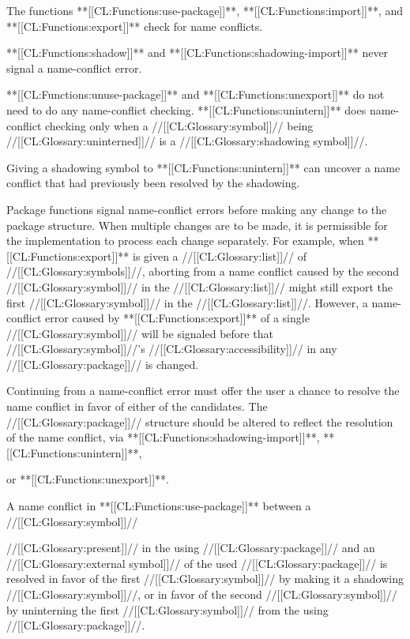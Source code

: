 \itemitem{--}  The functions **[[CL:Functions:use-package]]**, **[[CL:Functions:import]]**, and  **[[CL:Functions:export]]** check for name conflicts.  

\itemitem{--}  **[[CL:Functions:shadow]]** and **[[CL:Functions:shadowing-import]]**  never signal a name-conflict error.

\itemitem{--} 

**[[CL:Functions:unuse-package]]** and **[[CL:Functions:unexport]]** do not need to do any name-conflict checking. **[[CL:Functions:unintern]]** does name-conflict checking only when a //[[CL:Glossary:symbol]]//  being //[[CL:Glossary:uninterned]]// is a //[[CL:Glossary:shadowing symbol]]//.

\itemitem{--}  Giving a shadowing symbol to **[[CL:Functions:unintern]]**  can uncover a name conflict that had previously been resolved by the shadowing.  

  \itemitem{--} 
  Package functions signal name-conflict errors  before making any
  change to the package structure.  When multiple changes are to be made,
  it is
  permissible for the implementation to process each change separately.
  For example, when **[[CL:Functions:export]]** is given a  //[[CL:Glossary:list]]// of  //[[CL:Glossary:symbols]]//,
  aborting from a name
  conflict caused by the second //[[CL:Glossary:symbol]]// 
  in the //[[CL:Glossary:list]]// might still export the
  first //[[CL:Glossary:symbol]]// in the //[[CL:Glossary:list]]//.  
  However, a name-conflict error caused by **[[CL:Functions:export]]**
  of a single //[[CL:Glossary:symbol]]// will be signaled before
  that //[[CL:Glossary:symbol]]//'s //[[CL:Glossary:accessibility]]// in any //[[CL:Glossary:package]]// is changed.

\itemitem{--}  Continuing from a name-conflict error must offer the user a chance to resolve the name conflict in favor of either of the candidates.  The //[[CL:Glossary:package]]//  structure should be altered to reflect the resolution of the name conflict, via **[[CL:Functions:shadowing-import]]**,  **[[CL:Functions:unintern]]**,

or **[[CL:Functions:unexport]]**.

\itemitem{--}  A name conflict in **[[CL:Functions:use-package]]** between a //[[CL:Glossary:symbol]]// 

//[[CL:Glossary:present]]// in the using //[[CL:Glossary:package]]// and an //[[CL:Glossary:external symbol]]// of the used  //[[CL:Glossary:package]]// is resolved in favor of the first //[[CL:Glossary:symbol]]// by making it a shadowing //[[CL:Glossary:symbol]]//, or in favor of the second //[[CL:Glossary:symbol]]// by uninterning the first //[[CL:Glossary:symbol]]// from the using //[[CL:Glossary:package]]//. 

